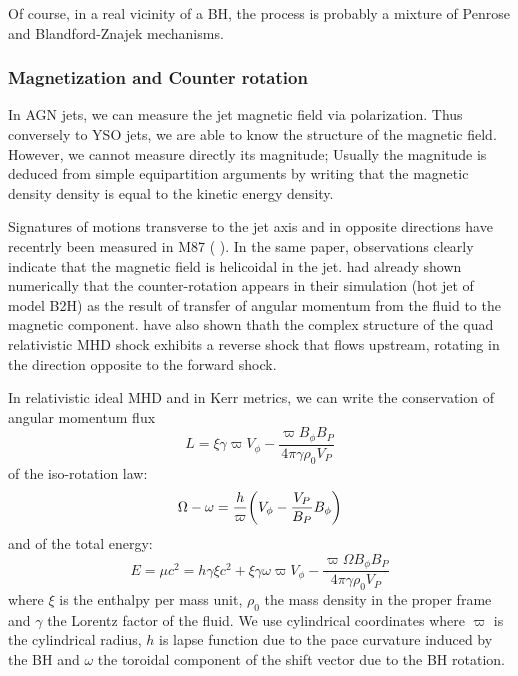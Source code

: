 \documentclass[10pt,a4paper,english]{article}
\let\originalleft\left
\let\originalright\right
\renewcommand{\left}{\mathopen{}\mathclose\bgroup\originalleft}
\renewcommand{\right}{\aftergroup\egroup\originalright}
\begin{document}
Of course, in a real vicinity of a BH, the process is probably a
mixture of Penrose and Blandford-Znajek mechanisms.
\subsubsection{Magnetization and Counter rotation}
In AGN jets, we can measure the jet magnetic field via
polarization. Thus conversely to YSO jets, we are able to know the
structure of the magnetic field. However, we cannot measure directly
its magnitude; Usually the magnitude is deduced from simple
equipartition arguments by writing that the magnetic density density
is equal to the kinetic energy density.

Signatures of motions transverse to the jet axis and in opposite
directions have recentrly been measured in M87
(\cite{2013ApJ...774L..21M} ). In the same paper,
observations clearly indicate that the magnetic field is helicoidal in
the jet. \cite{2009MNRAS.394.1182K} had already shown numerically that
the counter-rotation appears in their simulation (hot jet of model
B2H) as the result of transfer of angular momentum from the fluid to
the magnetic component. \cite{2010ApJ...721.1783N} have also
shown thath the complex structure of the quad relativistic MHD shock
exhibits a reverse shock that flows upstream, rotating in the
direction opposite to the forward shock.

In relativistic ideal MHD and in Kerr metrics, we can write the
conservation of angular momentum flux
\begin{equation}
  L = \xi\gamma\varpi V_\phi - \frac{\varpi B_\phi B_P}{4\pi\gamma\rho_0 V_P}
\end{equation} of the iso-rotation law:
\begin{equation}
  \Omega - \omega = \frac{h}{\varpi}\left( V_\phi - \frac{V_P}{B_P}B_\phi \right)
\end{equation}
and of the total energy:
\begin{equation}
  E = \mu c^2 = h\gamma \xi c^2 + \xi \gamma \omega \varpi V_\phi - \frac{\varpi \Omega B_\phi B_P}{4\pi\gamma\rho_0 V_P}
\end{equation}
where $\xi$ is the enthalpy per mass unit, $\rho_0$ the mass density
in the proper frame and $\gamma$ the Lorentz factor of the fluid. We
use cylindrical coordinates where $\varpi$ is the cylindrical radius,
$h$ is lapse function due to the pace curvature induced by the BH and
$\omega$ the toroidal component of the shift vector due to the BH
rotation.
\end{document}
